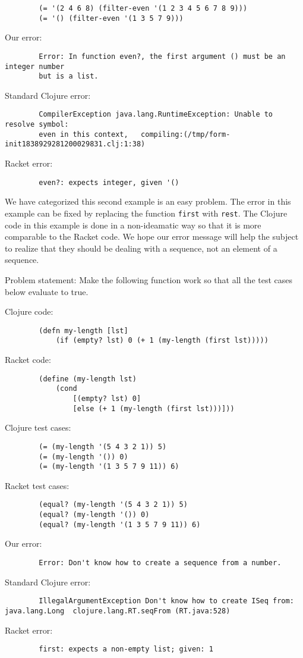 \documentclass[12pt]{article}
\begin{document}
\begin{verbatim}
		(= '(2 4 6 8) (filter-even '(1 2 3 4 5 6 7 8 9)))
		(= '() (filter-even '(1 3 5 7 9)))
\end{verbatim}

	Our error:
\begin{verbatim}
		Error: In function even?, the first argument () must be an integer number 
		but is a list.
\end{verbatim}

	Standard Clojure error:
\begin{verbatim}
		CompilerException java.lang.RuntimeException: Unable to resolve symbol: 
		even in this context, 	compiling:(/tmp/form-init1838929281200029831.clj:1:38) 
\end{verbatim}

	Racket error:
\begin{verbatim}
		even?: expects integer, given '()
\end{verbatim}


	We have categorized this second example is an easy problem.
	The error in this example can be fixed by replacing the function \texttt{first} with \texttt{rest}.
	The Clojure code in this example is done in a non-ideamatic way so that it is more comparable to the Racket code.
	We hope our error message will help the subject to realize that they should be dealing with a sequence, not an element of a sequence. 
	
	
	

	Problem statement:
		Make the following function work so that all the test cases below evaluate to true. 
		
		
	Clojure code:
\begin{verbatim}
		(defn my-length [lst]
 			(if (empty? lst) 0 (+ 1 (my-length (first lst)))))
\end{verbatim}
	Racket code:
\begin{verbatim}
		(define (my-length lst)
  			(cond
 				[(empty? lst) 0]
   				[else (+ 1 (my-length (first lst)))]))
\end{verbatim}
	Clojure test cases:
\begin{verbatim}
		(= (my-length '(5 4 3 2 1)) 5)
		(= (my-length '()) 0)
		(= (my-length '(1 3 5 7 9 11)) 6)
\end{verbatim}
	Racket test cases:
\begin{verbatim}
		(equal? (my-length '(5 4 3 2 1)) 5)
		(equal? (my-length '()) 0)
		(equal? (my-length '(1 3 5 7 9 11)) 6)
\end{verbatim}
	Our error:
\begin{verbatim}
		Error: Don't know how to create a sequence from a number.
\end{verbatim}
	Standard Clojure error:
\begin{verbatim}
		IllegalArgumentException Don't know how to create ISeq from: java.lang.Long  clojure.lang.RT.seqFrom (RT.java:528)

\end{verbatim}
	Racket error:
\begin{verbatim}
		first: expects a non-empty list; given: 1
		
\end{verbatim}
\end{document}
